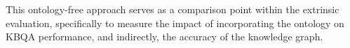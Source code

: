 \documentclass[a4, conference]{IEEEtran}
\begin{document}
This ontology-free approach serves as a comparison point within the extrinsic evaluation, specifically to measure the impact of incorporating the ontology on KBQA performance, and indirectly, the accuracy of the knowledge graph.




\end{document}
